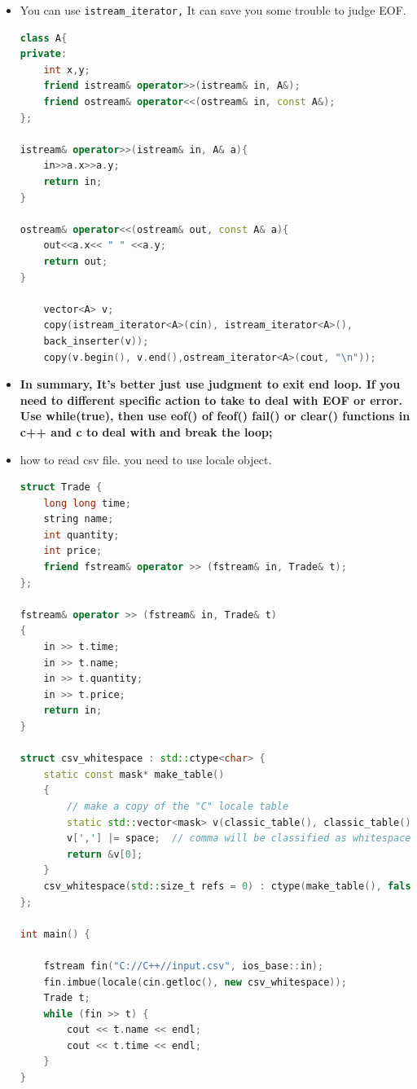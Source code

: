 \documentclass[a4paper,11pt,twoside]{book}
\begin{document}
\begin{itemize}
\begin{lstlisting}[numbers=none]
while(!issapce(cin.get()))
	continue;  //method 2
	
basic_istream& ignore(streamsize _Count = 1, \
int_type _Delim = traits_type::eof());  //method 3
cin.ignore(5, 'a');
cin.ignore(numeric_limits<streamsize>::max(), '\n');
\end{lstlisting}
	
	\item You can use \texttt{istream\_iterator,} It can save you some trouble to judge EOF.
	
\begin{lstlisting}[frame=single, language=c++]
class A{
private:
	int x,y;
	friend istream& operator>>(istream& in, A&);
	friend ostream& operator<<(ostream& in, const A&);
};
	
istream& operator>>(istream& in, A& a){
	in>>a.x>>a.y;
	return in;
}
	
ostream& operator<<(ostream& out, const A& a){
	out<<a.x<< " " <<a.y;
	return out;
}
	
	vector<A> v;
	copy(istream_iterator<A>(cin), istream_iterator<A>(),
	back_inserter(v));
	copy(v.begin(), v.end(),ostream_iterator<A>(cout, "\n"));
\end{lstlisting}
	
	
	\item \textbf{In summary, It's better just use judgment to exit end loop.  If you need to different specific action to take to deal with EOF or error. Use while(true), then use eof() of feof() fail() or clear() functions in c++ and c to deal with and break the loop; }
	
	\item how to read csv file. you need to use locale object. 
\begin{lstlisting}[frame=single, language=c++]	
struct Trade {
	long long time;
	string name;
	int quantity;
	int price;
	friend fstream& operator >> (fstream& in, Trade& t);
};

fstream& operator >> (fstream& in, Trade& t)
{
	in >> t.time;
	in >> t.name;
	in >> t.quantity;
	in >> t.price;
	return in;
}

struct csv_whitespace : std::ctype<char> {
	static const mask* make_table()
	{
		// make a copy of the "C" locale table
		static std::vector<mask> v(classic_table(), classic_table() + table_size);
		v[','] |= space;  // comma will be classified as whitespace
		return &v[0];
	}
	csv_whitespace(std::size_t refs = 0) : ctype(make_table(), false, refs) {}
};

int main() {    
	
	fstream fin("C://C++//input.csv", ios_base::in);
	fin.imbue(locale(cin.getloc(), new csv_whitespace));
	Trade t;
	while (fin >> t) {
		cout << t.name << endl;
		cout << t.time << endl;
	}	
}
\end{lstlisting}	


\end{itemize}
\end{document}
